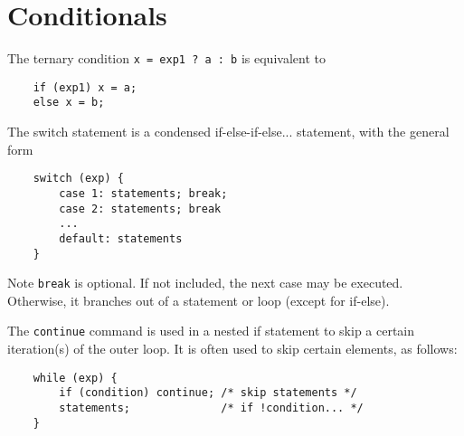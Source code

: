 \documentclass{tufte-book}
\begin{document}
\section{Conditionals}
The ternary condition \lstinline{x = exp1 ? a : b} is equivalent to
\begin{lstlisting}
    if (exp1) x = a;
    else x = b;
\end{lstlisting}
The switch statement is a condensed if-else-if-else... statement, with the general form
\begin{lstlisting}
    switch (exp) {
        case 1: statements; break;
        case 2: statements; break
        ...
        default: statements
    }
\end{lstlisting}
Note \lstinline{break} is optional. If not included, the next case may be executed. Otherwise, it branches out of a statement or loop (except for if-else).

\bigskip
The \lstinline{continue} command is used in a nested if statement to skip a certain iteration(s) of the outer loop. It is often used to skip certain elements, as follows:
\begin{lstlisting}
    while (exp) {
        if (condition) continue; /* skip statements */
        statements;              /* if !condition... */
    }
\end{lstlisting}
\end{document}
